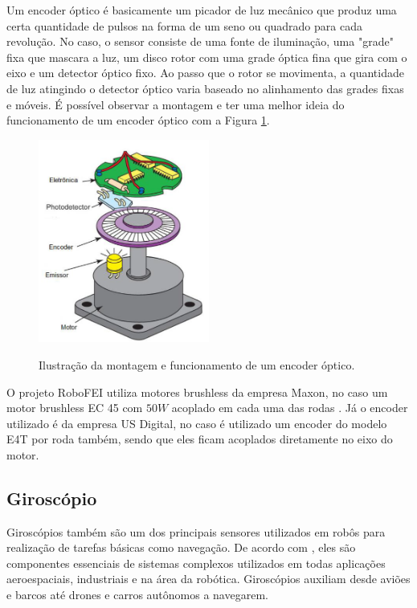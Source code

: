 \documentclass[acronym, symbols, table]{fei}
\begin{document}
				Um encoder óptico é basicamente um picador de luz mecânico que produz uma certa quantidade de pulsos na forma de um seno ou quadrado para cada revolução. No caso, o sensor consiste de uma fonte de iluminação, uma "grade" fixa que mascara a luz, um disco rotor com uma grade óptica fina que gira com o eixo e um detector óptico fixo. Ao passo que o rotor se movimenta, a quantidade de luz atingindo o detector óptico varia baseado no alinhamento das grades fixas e móveis. É possível observar a montagem e ter uma melhor ideia do funcionamento de um encoder óptico com a Figura \ref{fig:optical_encoder}.
				
				\begin{figure}[!htb]
					\centering
					\caption{Ilustração da montagem e funcionamento de um encoder óptico.} 
					\includegraphics[width=0.5\textwidth]{encoder_optico.png}
					\label{fig:optical_encoder}
				\end{figure}
				
				O projeto RoboFEI utiliza motores brushless da empresa Maxon\textregistered, no caso um motor brushless EC 45 com $50W$ acoplado em cada uma das rodas \cite{ec45_maxon}. Já o encoder utilizado é da empresa US Digital\textregistered \cite{e4t_encoder}, no caso é utilizado um encoder do modelo E4T por roda também, sendo que eles ficam acoplados diretamente no eixo do motor.
			
			\subsection{Giroscópio} \label{sec:sensores_giroscopio}
			
				Giroscópios também são um dos principais sensores utilizados em robôs para realização de tarefas básicas como navegação. De acordo com \textcite{jeremydingman2020}, eles são componentes essenciais de sistemas complexos utilizados em todas aplicações aeroespaciais, industriais e na área da robótica. Giroscópios auxiliam desde aviões e barcos até drones e carros autônomos a navegarem.
				
\end{document}
